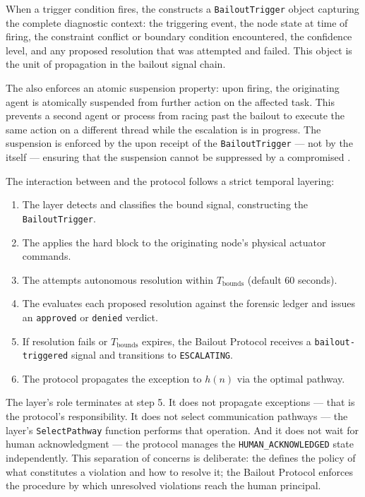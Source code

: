 When a trigger condition fires, the \bounds{} constructs a \texttt{BailoutTrigger} object capturing the complete diagnostic context: the triggering event, the node state at time of firing, the constraint conflict or boundary condition encountered, the \bounds{} confidence level, and any proposed resolution that was attempted and failed. This object is the unit of propagation in the bailout signal chain.

The \bounds{} also enforces an atomic suspension property: upon firing, the originating agent is atomically suspended from further action on the affected task. This prevents a second agent or process from racing past the bailout to execute the same action on a different thread while the escalation is in progress. The suspension is enforced by the \fact{} upon receipt of the \texttt{BailoutTrigger} — not by the \bounds{} itself — ensuring that the suspension cannot be suppressed by a compromised \bounds{}.

The interaction between \bounds{} and the protocol follows a strict temporal layering:

\begin{enumerate}
\item The \bounds{} layer detects and classifies the bound signal, constructing the \texttt{BailoutTrigger}.
\item The \fact{} applies the hard block to the originating node's physical actuator commands.
\item The \bounds{} attempts autonomous resolution within $T_{\text{bounds}}$ (default 60 seconds).
\item The \fact{} evaluates each proposed resolution against the forensic ledger and issues an \texttt{approved} or \texttt{denied} verdict.
\item If resolution fails or $T_{\text{bounds}}$ expires, the Bailout Protocol receives a \texttt{bailout-triggered} signal and transitions to \texttt{ESCALATING}.
\item The protocol propagates the exception to $h(n)$ via the optimal pathway.
\end{enumerate}

The \bounds{} layer's role terminates at step 5. It does not propagate exceptions — that is the protocol's responsibility. It does not select communication pathways — the \fact{} layer's \texttt{SelectPathway} function performs that operation. And it does not wait for human acknowledgment — the protocol manages the \texttt{HUMAN\_ACKNOWLEDGED} state independently. This separation of concerns is deliberate: the \bounds{} defines the policy of what constitutes a violation and how to resolve it; the Bailout Protocol enforces the procedure by which unresolved violations reach the human principal.

